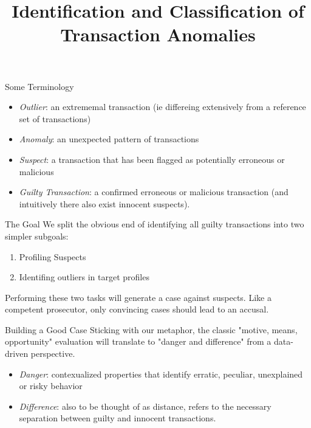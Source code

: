 \documentclass[aspectratio=169]{beamer}
\title[Transaction Anomaly Detection]{Identification and Classification of Transaction Anomalies}
\institute{Applying isolation outlier detection and topological profiling to GL Transaction data.}
\begin{document}
  \begin{frame}
    \titlepage
  \end{frame}

\begin{frame}{Some Terminology}
  \begin{itemize}
    \item \textit{Outlier}: an extrememal transaction (ie differeing extensively from a reference set of transactions) 
    \item \textit{Anomaly}: an unexpected pattern of transactions
    \item \textit{Suspect}: a transaction that has been flagged as potentially erroneous or malicious
    \item \textit{Guilty Transaction}: a confirmed erroneous or malicious transaction (and intuitively there also exist innocent suspects).
  \end{itemize}
\end{frame}

\begin{frame}{The Goal}
We split the obvious end of identifying all guilty transactions into two simpler subgoals: 
\begin{enumerate}
  \item Profiling Suspects 
  \item Identifing outliers in target profiles 
\end{enumerate}
Performing these two tasks will generate a case against suspects. Like a competent prosecutor, only convincing cases should 
lead to an accusal. 
\end{frame}
  \begin{frame}{Building a Good Case}
    Sticking with our metaphor, the classic "motive, means, opportunity" evaluation
    will translate to "danger and difference" from a data-driven perspective. 
    \begin{itemize}
      \item \textit{Danger}: contexualized properties that identify erratic, peculiar, 
    unexplained or risky behavior
    \item \textit{Difference}: also to be thought of as distance, refers to the necessary 
    separation between guilty and innocent transactions.      
    \end{itemize}
    
  \end{frame}
\end{document}
